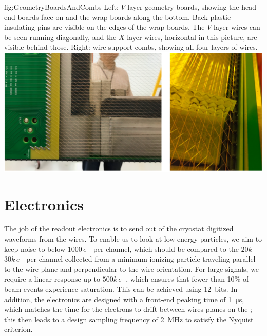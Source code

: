 \begin{dunefigure}{fig:GeometryBoardsAndCombs}
{Left: $V$-layer geometry boards, showing the head-end boards face-on and the wrap boards along the bottom. Back plastic insulating pins are visible on the edges of the wrap boards. The $V$-layer wires can be seen running diagonally, and the $X$-layer wires, horizontal in this picture, are visible behind those.  Right: wire-support combs, showing all four layers of wires.}
\includegraphics[width=\textwidth]{graphics/GeometryBoardsAndCombs.pdf}
\end{dunefigure}



\section{Electronics}
\label{sec:fdsp-exec-electronics}

The job of the readout electronics is to send out of the cryostat digitized waveforms from the  wires. To enable us to look at low-energy particles, we aim to keep noise to below $1000\,e^{-}$ per channel, which should be compared to the $20k$--$30k\,e^{-}$ per channel collected from a minimum-ionizing particle traveling parallel to the wire plane and perpendicular to the wire orientation. For large signals, we require a linear response up to $500k\,e^{-}$, which ensures that fewer than 10\% of beam events experience saturation. This can be achieved using 12\,  bits. In addition, the electronics are designed with a front-end peaking time of \SI{1}{\micro\second}, which matches the time for the electrons to drift between wires planes on the ; this then leads to a design sampling frequency of \SI{2}{\mega\hertz} to satisfy the Nyquist criterion.

